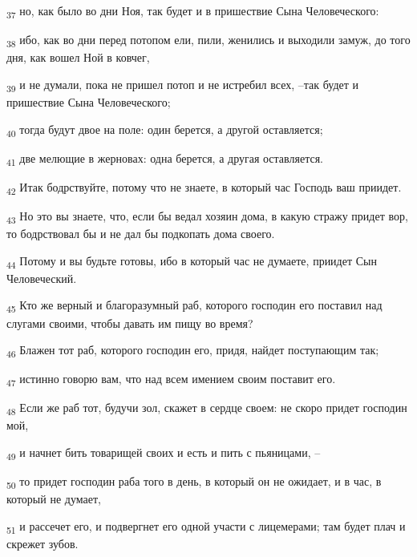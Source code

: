 \begin{tcolorbox}
\textsubscript{37} но, как было во дни Ноя, так будет и в пришествие Сына Человеческого:
\end{tcolorbox}
\begin{tcolorbox}
\textsubscript{38} ибо, как во дни перед потопом ели, пили, женились и выходили замуж, до того дня, как вошел Ной в ковчег,
\end{tcolorbox}
\begin{tcolorbox}
\textsubscript{39} и не думали, пока не пришел потоп и не истребил всех, --так будет и пришествие Сына Человеческого;
\end{tcolorbox}
\begin{tcolorbox}
\textsubscript{40} тогда будут двое на поле: один берется, а другой оставляется;
\end{tcolorbox}
\begin{tcolorbox}
\textsubscript{41} две мелющие в жерновах: одна берется, а другая оставляется.
\end{tcolorbox}
\begin{tcolorbox}
\textsubscript{42} Итак бодрствуйте, потому что не знаете, в который час Господь ваш приидет.
\end{tcolorbox}
\begin{tcolorbox}
\textsubscript{43} Но это вы знаете, что, если бы ведал хозяин дома, в какую стражу придет вор, то бодрствовал бы и не дал бы подкопать дома своего.
\end{tcolorbox}
\begin{tcolorbox}
\textsubscript{44} Потому и вы будьте готовы, ибо в который час не думаете, приидет Сын Человеческий.
\end{tcolorbox}
\begin{tcolorbox}
\textsubscript{45} Кто же верный и благоразумный раб, которого господин его поставил над слугами своими, чтобы давать им пищу во время?
\end{tcolorbox}
\begin{tcolorbox}
\textsubscript{46} Блажен тот раб, которого господин его, придя, найдет поступающим так;
\end{tcolorbox}
\begin{tcolorbox}
\textsubscript{47} истинно говорю вам, что над всем имением своим поставит его.
\end{tcolorbox}
\begin{tcolorbox}
\textsubscript{48} Если же раб тот, будучи зол, скажет в сердце своем: не скоро придет господин мой,
\end{tcolorbox}
\begin{tcolorbox}
\textsubscript{49} и начнет бить товарищей своих и есть и пить с пьяницами, --
\end{tcolorbox}
\begin{tcolorbox}
\textsubscript{50} то придет господин раба того в день, в который он не ожидает, и в час, в который не думает,
\end{tcolorbox}
\begin{tcolorbox}
\textsubscript{51} и рассечет его, и подвергнет его одной участи с лицемерами; там будет плач и скрежет зубов.
\end{tcolorbox}
